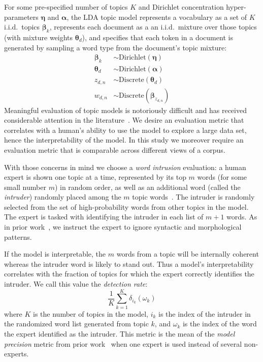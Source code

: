 \documentclass[11pt,letterpaper]{article}
\renewcommand{\vec}{\boldsymbol}   %
\newcommand{\valpha}{{\vec{\alpha}}}
\newcommand{\vtheta}{{\vec{\theta}}}
\newcommand{\veta}{{\vec{\eta}}}
\newcommand{\vbeta}{{\vec{\beta}}}
\newcommand{\dirac}[2]{\delta_{#1}\left(#2\right)}
\newcommand{\Discrete}{\ensuremath{\mathrm{Discrete}}}
\newcommand{\Dirichlet}{\ensuremath{\mathrm{Dirichlet}}}
\begin{document}
{For some pre-specified
number of topics $K$ and Dirichlet concentration hyper-parameters
$\veta$ and $\valpha$, the LDA topic model represents a vocabulary as a
set of $K$ i.i.d.\ topics $\vbeta_k$, represents each document as a
an i.i.d.\ mixture over those topics (with mixture weights
$\vtheta_d$), and specifies that each token in a document is
generated by sampling a word type from the document's topic mixture:
\begin{align*}
    \vbeta_k  & \sim \Dirichlet\left(\veta\right) \\
    \vtheta_d & \sim \Dirichlet\left(\valpha\right) \\
    z_{d,n}              & \sim \Discrete\left(\vtheta_d\right) \\
    w_{d,n}              & \sim \Discrete\left(\vbeta_{z_{d,n}}\right)
\end{align*}
Meaningful evaluation of topic models is notoriously
difficult and has received considerable attention in the
literature~\cite{chang2009,wallach2009a,newman2010,mimno2011,lau2014}.
We desire an evaluation metric that correlates with a
human's ability to use the model to explore a large data set,
hence the interpretability of the model.  In this study we moreover
require an evaluation metric that is comparable across different views
of a corpus.

With those concerns in mind we choose a \emph{word intrusion}
evaluation:
a human expert is shown one topic at a time, represented
by its top $m$ words (for some small number $m$) in random order, as
well as an additional word (called the \emph{intruder}) randomly placed
among the $m$ topic words~\cite{chang2009}.
The intruder is randomly selected from the set of high-probability
words from other topics in the model.
The expert is tasked with identifying the intruder in each list of
$m + 1$ words.
As in prior work~\cite{chang2009}, we instruct the expert to ignore
syntactic and morphological patterns.

If the model is interpretable, the $m$ words from a topic will be
internally coherent whereas the intruder word is likely to stand out.
Thus a model's interpretability correlates with the fraction
of topics for which the expert correctly identifies the intruder.  We
call this value the \emph{detection rate}:
\begin{equation*}
    \frac{1}{K} \sum_{k=1}^K \dirac{i_k}{\omega_k}
\end{equation*}
where $K$ is the number of topics in the model, $i_k$ is the index
of the intruder in the randomized word list generated from topic $k$,
and $\omega_k$ is the index of the word the expert identified as the
intruder.  This metric is the mean of the
\emph{model precision} metric from prior work~\cite{chang2009}
when one expert is used instead of several non-experts.

}
\end{document}
